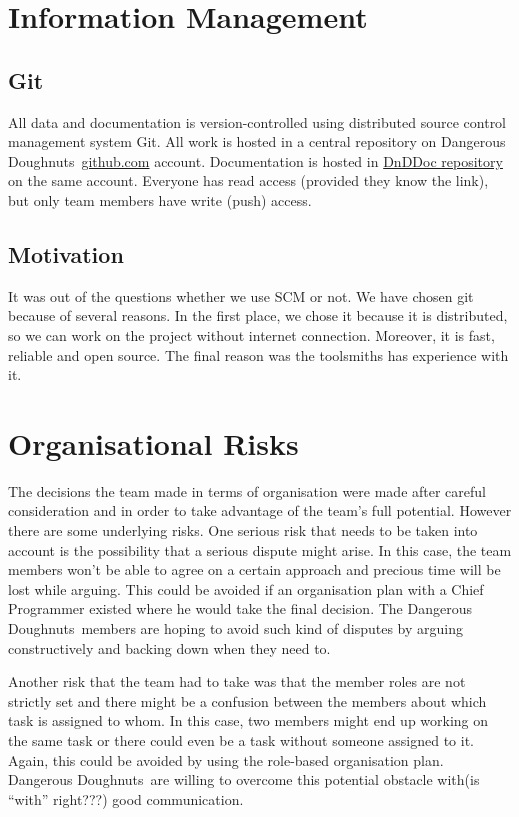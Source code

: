 \documentclass{article}
\newcommand{\dnd}{Dangerous Doughnuts}
\begin{document}

\section{Information Management}
\label{info}

\subsection{Git}
All data and documentation is version-controlled using distributed source control management system Git.
All work is hosted in a central repository on \dnd\ \href{https://github.com/DangerousDoughnuts/}{github.com} account.
Documentation is hosted in \href{https://github.com/DangerousDoughnuts/DnDDoc}{DnDDoc repository} on the same account.
Everyone has read access (provided they know the link), but only team members have write (push) access.

\subsection{Motivation}
It was out of the questions whether we use SCM or not. We have chosen git because of several reasons.
In the first place, we chose it because it is distributed, so we can work on the project without internet connection.
Moreover, it is fast, reliable and open source. The final reason was the toolsmiths has experience with it.



\section{Organisational Risks}
\label{lastSection}

The decisions the team made in terms of organisation were made after careful consideration and in order to take advantage of the team's full potential. However there are some underlying risks. One serious risk that needs to be taken into account is the possibility that a serious dispute might arise. In this case, the team members won't be able to agree on a certain approach and precious time will be lost while arguing. This could be avoided if an organisation plan with a Chief Programmer existed where he would take the final decision. The \dnd\ members are hoping to avoid such kind of disputes by arguing constructively and backing down when they need to.

Another risk that the team had to take was that the member roles are not strictly set and there might be a confusion between the members about which task is assigned to whom. In this case, two members might end up working on the same task or there could even be a task without someone assigned to it. Again, this could be avoided by using the role-based organisation plan. \dnd\ are willing to overcome this potential obstacle with(is ``with'' right???) good communication.




\end{document}
